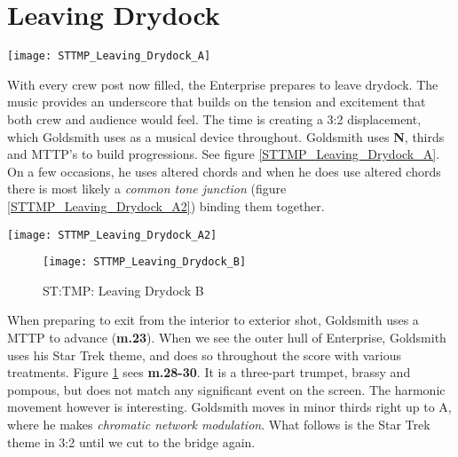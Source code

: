 \section{Leaving Drydock}\label{sec:leaving drydock}
\begin{figure*}[h!]
\center
\texttt{[image: STTMP\_Leaving\_Drydock\_A]}
	\caption{ST:TMP: Leaving Drydock A}
	\label{STTMP_Leaving_Drydock_A}
\end{figure*}

\noindent With every crew post now filled, the Enterprise prepares to leave drydock. The music provides an underscore that builds on the tension and excitement that both crew and audience would feel. The time is  creating a 3:2 displacement, which Goldsmith uses as a musical device throughout. Goldsmith uses \textbf{N}, thirds and \acf{MTTP}'s to build progressions. See figure \ref{STTMP_Leaving_Drydock_A}. On a few occasions, he uses altered chords and when he does use altered chords there is most likely a \textit{common tone junction} (figure \ref{STTMP_Leaving_Drydock_A2}) binding them together. 

\begin{marginfigure}
\texttt{[image: STTMP\_Leaving\_Drydock\_A2]}
	\caption{ST:TMP: Leaving Drydock A: Common Tones}
	\label{STTMP_Leaving_Drydock_A2}
\end{marginfigure}

\begin{figure}[h!]
\center
\texttt{[image: STTMP\_Leaving\_Drydock\_B]}
	\caption{ST:TMP: Leaving Drydock B}
	\label{STTMP_Leaving_Drydock_B}
\end{figure}
When preparing to exit from the interior to exterior shot, Goldsmith uses a \ac{MTTP} to advance (\textbf{m.23}). When we see the outer hull of Enterprise, Goldsmith uses his Star Trek theme, and does so throughout the score with various treatments. Figure \ref{STTMP_Leaving_Drydock_B} sees \textbf{m.28-30}. It is a three-part trumpet, brassy and pompous, but does not match any significant event on the screen. The harmonic movement however is interesting. Goldsmith moves in minor thirds right up to A, where he makes \textit{chromatic network modulation}. What follows is the Star Trek theme in 3:2 until we cut to the bridge again.

